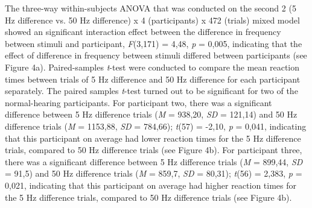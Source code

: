 \documentclass[12pt]{article}
\begin{document}
%
\par The three-way within-subjects ANOVA that was conducted on the second 2 (5 Hz difference vs. 50 Hz difference) x 4 (participants) x 472 (trials) mixed model showed an significant interaction effect between the difference in frequency between stimuli and participant, \textit{F}(3,171) = 4,48, \textit{p} = 0,005, indicating that the effect of difference in frequency between stimuli differed between participants (see Figure 4a). Paired-samples \textit{t}-test were conducted to compare the mean reaction times between trials of 5 Hz difference and 50 Hz difference for each participant separately. The paired samples \textit{t}-test  turned out to be significant for two of the normal-hearing participants. For participant two, there was a significant difference between 5 Hz difference trials (\textit{M} = 938,20, \textit{SD} = 121,14) and 50 Hz difference trials (\textit{M} = 1153,88, \textit{SD} = 784,66); \textit{t}(57) = -2,10, \textit{p} = 0,041, indicating that this participant on average had lower reaction times for the 5 Hz difference trials, compared to 50 Hz difference trials (see Figure 4b). For participant three, there was a significant difference between 5 Hz difference trials (\textit{M} = 899,44, \textit{SD} = 91,5) and 50 Hz difference trials (\textit{M} = 859,7, \textit{SD} = 80,31); \textit{t}(56) = 2,383, \textit{p} = 0,021, indicating that this participant on average had higher reaction times for the 5 Hz difference trials, compared to 50 Hz difference trials (see Figure 4b).
%
\end{document}
